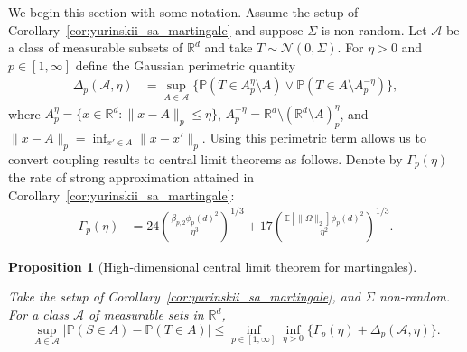 \documentclass[11pt,lof]{puthesis}
\renewcommand{\P}{\ensuremath{\mathbb{P}}}
\newcommand{\R}{\ensuremath{\mathbb{R}}}
\newcommand{\E}{\ensuremath{\mathbb{E}}}
\newcommand{\cN}{\ensuremath{\mathcal{N}}}
\newcommand{\cA}{\ensuremath{\mathcal{A}}}
\theoremstyle{break}
\newtheorem{proposition}{Proposition}[section]
\theoremstyle{proof}
\begin{document}
We begin this section with some notation. Assume the setup of
Corollary~\ref{cor:yurinskii_sa_martingale} and suppose $\Sigma$ is
non-random. Let $\cA$ be a class of measurable subsets of
$\R^d$ and take $T \sim \cN(0, \Sigma)$.
For $\eta>0$ and $p \in [1, \infty]$ define the Gaussian perimetric quantity
%
\begin{align*}
\Delta_p(\cA, \eta)
&=
\sup_{A\in \cA}
\big\{\P(T\in A_p^\eta\setminus A)
\vee \P(T\in A \setminus A_p^{-\eta})\big\},
\end{align*}
%
where $A_p^\eta = \{x \in \R^d : \|x - A\|_p \leq \eta\}$,
$A_p^{-\eta} = \R^d \setminus (\R^d \setminus A)_p^\eta$,
and $\|x - A\|_p = \inf_{x' \in A} \|x - x'\|_p$.
Using this perimetric term allows us to convert coupling results
to central limit theorems as follows.
Denote by $\Gamma_p(\eta)$ the rate of strong approximation attained in
Corollary~\ref{cor:yurinskii_sa_martingale}:
%
\begin{align*}
\Gamma_p(\eta)
&=
24 \left(
\frac{\beta_{p,2} \phi_p(d)^2}{\eta^3}
\right)^{1/3}
+ 17 \left(
\frac{\E \left[ \|\Omega\|_2 \right] \phi_p(d)^2}{\eta^2}
\right)^{1/3}.
\end{align*}

\begin{proposition}[High-dimensional central limit theorem for martingales]%
\label{pro:yurinskii_app_clt}

Take the setup of Corollary~\ref{cor:yurinskii_sa_martingale},
and $\Sigma$ non-random.
For a class $\cA$ of measurable sets in $\R^d$,
%
\begin{equation}%
\label{eq:yurinskii_app_high_dim_clt}
\sup_{A\in \cA}
\big|\P(S\in A) -\P(T\in A)\big|
\leq \inf_{p \in [1, \infty]} \inf_{\eta>0}
\big\{\Gamma_p(\eta) + \Delta_p(\cA, \eta) \big\}.
\end{equation}
\end{proposition}
\end{document}
